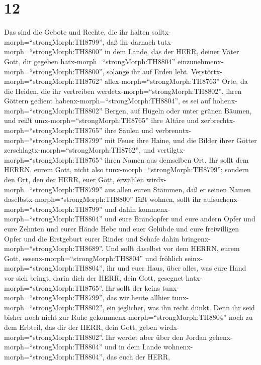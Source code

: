 \hypertarget{section-11}{%
\section{12}\label{section-11}}

 Das sind die Gebote und Rechte, die ihr halten
solltx-morph=``strongMorph:TH8799'', daß ihr darnach
tutx-morph=``strongMorph:TH8800'' in dem Lande, das der HERR, deiner
Väter Gott, dir gegeben hatx-morph=``strongMorph:TH8804''
einzunehmenx-morph=``strongMorph:TH8800'', solange ihr auf Erden lebt.
 Verstörtx-morph=``strongMorph:TH8762''
allex-morph=``strongMorph:TH8763'' Orte, da die Heiden, die ihr
vertreiben werdetx-morph=``strongMorph:TH8802'', ihren Göttern gedient
habenx-morph=``strongMorph:TH8804'', es sei auf
hohenx-morph=``strongMorph:TH8802'' Bergen, auf Hügeln oder unter grünen
Bäumen,  und reißt umx-morph=``strongMorph:TH8765'' ihre
Altäre und zerbrechtx-morph=``strongMorph:TH8765'' ihre Säulen und
verbrenntx-morph=``strongMorph:TH8799'' mit Feuer ihre Haine, und die
Bilder ihrer Götter zerschlagtx-morph=``strongMorph:TH8762'', und
vertilgtx-morph=``strongMorph:TH8765'' ihren Namen aus demselben Ort.
 Ihr sollt dem HERRN, eurem Gott, nicht also
tunx-morph=``strongMorph:TH8799'';  sondern den Ort, den der
HERR, euer Gott, erwählen wirdx-morph=``strongMorph:TH8799'' aus allen
euren Stämmen, daß er seinen Namen
daselbstx-morph=``strongMorph:TH8800'' läßt wohnen, sollt ihr
aufsuchenx-morph=``strongMorph:TH8799'' und dahin
kommenx-morph=``strongMorph:TH8804''  und eure Brandopfer
und eure andern Opfer und eure Zehnten und eurer Hände Hebe und euer
Gelübde und eure freiwilligen Opfer und die Erstgeburt eurer Rinder und
Schafe dahin bringenx-morph=``strongMorph:TH8689''.  Und
sollt daselbst vor dem HERRN, eurem Gott,
essenx-morph=``strongMorph:TH8804'' und fröhlich
seinx-morph=``strongMorph:TH8804'', ihr und euer Haus, über alles, was
eure Hand vor sich bringt, darin dich der HERR, dein Gott, gesegnet
hatx-morph=``strongMorph:TH8765''.  Ihr sollt der keins
tunx-morph=``strongMorph:TH8799'', das wir heute allhier
tunx-morph=``strongMorph:TH8802'', ein jeglicher, was ihn recht dünkt.
 Denn ihr seid bisher noch nicht zur Ruhe
gekommenx-morph=``strongMorph:TH8804'' noch zu dem Erbteil, das dir der
HERR, dein Gott, geben wirdx-morph=``strongMorph:TH8802''. 
Ihr werdet aber über den Jordan gehenx-morph=``strongMorph:TH8804'' und
in dem Lande wohnenx-morph=``strongMorph:TH8804'', das euch der HERR,
